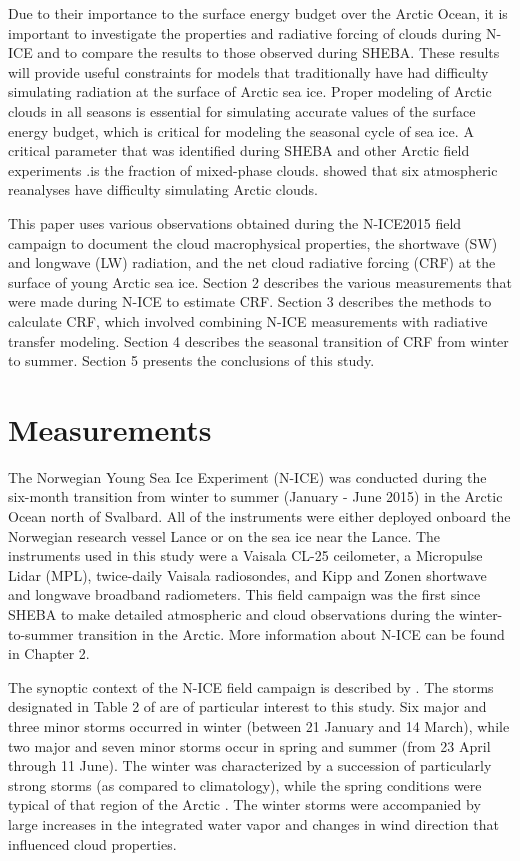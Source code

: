 Due to their importance to the surface energy budget over the Arctic Ocean, it is important to investigate the properties and radiative forcing of clouds during N-ICE and to compare the results to those observed during SHEBA. These results will provide useful constraints for models that traditionally have had difficulty simulating radiation at the surface of Arctic sea ice. Proper modeling of Arctic clouds in all seasons is essential for simulating accurate values of the surface energy budget, which is critical for modeling the seasonal cycle of sea ice. A critical parameter that was identified during SHEBA \citep{inoue:2008, tjernstrom:2005} and other Arctic field experiments \citep{hines:2017, listowski:2017, hines:2019}.is the fraction of mixed-phase clouds. \citet{graham:2017} showed that six atmospheric reanalyses have difficulty simulating Arctic clouds.

This paper uses various observations obtained during the N-ICE2015 field campaign to document the cloud macrophysical properties, the shortwave (SW) and longwave (LW) radiation, and the net cloud radiative forcing (CRF) at the surface of young Arctic sea ice. Section 2 describes the various measurements that were made during N-ICE to estimate CRF. Section 3 describes the methods to calculate CRF, which involved combining N-ICE measurements with radiative transfer modeling. Section 4 describes the seasonal transition of CRF from winter to summer. Section 5 presents the conclusions of this study.


\section{Measurements}

The Norwegian Young Sea Ice Experiment (N-ICE) was conducted during the six-month transition from winter to summer (January - June 2015) in the Arctic Ocean north of Svalbard. All of the instruments were either deployed onboard the Norwegian research vessel Lance or on the sea ice near the Lance. The instruments used in this study were a Vaisala CL-25 ceilometer, a Micropulse Lidar (MPL), twice-daily Vaisala radiosondes, and Kipp and Zonen shortwave and longwave broadband radiometers. This field campaign was the first since SHEBA to make detailed atmospheric and cloud observations during the winter-to-summer transition in the Arctic. More information about N-ICE can be found in Chapter 2. 

The synoptic context of the N-ICE field campaign is described by \citet{cohen:2017}. The storms designated in Table 2 of \citet{cohen:2017} are of particular interest to this study. Six major and three minor storms occurred in winter (between 21 January and 14 March), while two major and seven minor storms occur in spring and summer (from 23 April through 11 June). The winter was characterized by a succession of particularly strong storms (as compared to climatology), while the spring conditions were typical of that region of the Arctic \citep{graham:2017}. The winter storms were accompanied by large increases in the integrated water vapor and changes in wind direction \citep{kayser:2017} that influenced cloud properties.  

